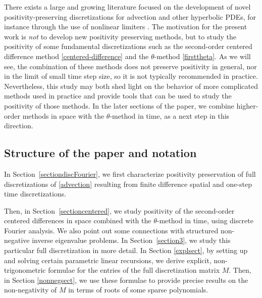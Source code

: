 \documentclass[a4paper]{article}
\begin{document}
There exists a large and growing literature focused on the development of novel
positivity-preserving discretizations for advection and other hyperbolic PDEs,
for instance through the use of nonlinear limiters 
\cite{hundsdorfer1995positive,liu1996,horvath1998,Higueras2010}.
The motivation for the present work is \emph{not} to develop new positivity preserving
methods, but to study the positivity of some fundamental discretizations
such as the second-order centered difference method \eqref{centered-difference} and the
$\theta$-method \eqref{firsttheta}.  As we will see, the combination of
these methods does not preserve positivity in general, nor in the limit
of small time step size, so it is not typically recommended in practice.
Nevertheless, this study may both shed light on the
behavior of more complicated methods used in practice and provide tools
that can be used to study the positivity of those methods.
In the later sections of the paper, we combine higher-order methods in space with the $\theta$-method in time, as a next step in this direction.


\subsection{Structure of the paper and notation}
In Section~\ref{sectiondiscFourier}, we first characterize
positivity preservation of full discretizations of \eqref{advection} resulting from 
finite difference spatial and one-step time discretizations. 

Then, in Section~\ref{sectioncentered}, we study positivity of the second-order centered differences in space
combined with the $\theta$-method in
time, using discrete Fourier
analysis. We also point out some connections with structured non-negative inverse eigenvalue problems. In Section~\ref{section3}, we study this particular full discretization in more detail.
In Section \ref{explsect}, by setting up and solving certain parametric linear recursions, we derive explicit, non-trigonometric formulae for the entries of the full discretization matrix $M$. Then, in Section \ref{nonnegsect}, we use these formulae to provide precise results on the non-negativity of $M$ in terms of roots of some  sparse polynomials.
\end{document}
